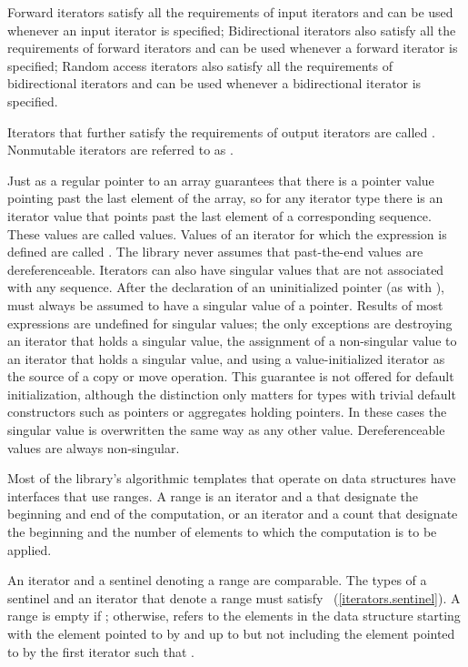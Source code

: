 \pnum
Forward iterators satisfy all the requirements of input
iterators and can be used whenever an input iterator is specified;
Bidirectional iterators also satisfy all the requirements of
forward iterators and can be used whenever a forward iterator is specified;
Random access iterators also satisfy all the requirements of bidirectional
iterators and can be used whenever a bidirectional iterator is specified.

\pnum
Iterators that further satisfy the requirements of output iterators are
called . Nonmutable iterators are referred to
as .

\pnum
Just as a regular pointer to an array guarantees that there is a pointer value pointing past the last element
of the array, so for any iterator type there is an iterator value that points past the last element of a
corresponding sequence.
These values are called
values.
Values of an iterator
for which the expression
is defined are called
.
The library never assumes that past-the-end values are dereferenceable.
Iterators can also have singular values that are not associated with any
sequence.
\enterexample
After the declaration of an uninitialized pointer
(as with
),
must always be assumed to have a singular value of a pointer.
\exitexample
Results of most expressions are undefined for singular values;
the only exceptions are destroying an iterator that holds a singular value,
the assignment of a non-singular value to
an iterator that holds a singular value, and using a value-initialized iterator
as the source of a copy or move operation. \enternote This guarantee is not
offered for default initialization, although the distinction only matters for types
with trivial default constructors such as pointers or aggregates holding pointers.
\exitnote
In these cases the singular
value is overwritten the same way as any other value.
Dereferenceable
values are always non-singular.

\pnum
Most of the library's algorithmic templates that operate on data structures have
interfaces that use ranges. A range is an iterator and a  that designate
the beginning and end of the computation, or an iterator and a count that designate
the beginning and the number of elements to which the computation is to be applied.

\pnum
An iterator and a sentinel denoting a range are comparable. The types of a sentinel
and an iterator that denote a range must satisfy
~(\ref{iterators.sentinel}).
A range 
is empty if ;
otherwise, 
refers to the elements in the data structure starting with the element
pointed to by
and up to but not including the element pointed to by
the first iterator  such that .

